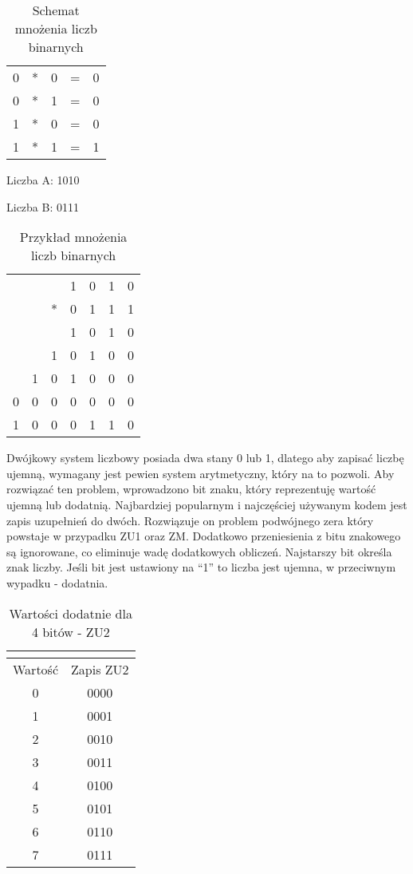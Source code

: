 \documentclass[12pt, a4paper, onside, polish]{article}				%
\begin{document}
\begin{table}[htb]
\caption{Schemat mnożenia liczb binarnych}
\centering
\begin{tabular}{lllll}
0 & * & 0 & = & 0 \\
0 & * & 1 & = & 0 \\
1 & * & 0 & = & 0 \\
1 & * & 1 & = & 1
\end{tabular}
\end{table}

Liczba A: 1010

Liczba B: 0111
\begin{table}[htb]
\caption{Przykład mnożenia liczb binarnych}
\centering
\begin{tabular}{lllllll}
 &  &  & 1 & 0 & 1 & 0 \\
 &  & * & 0 & 1 & 1 & 1 \\ \cline{3-7} 
 &  &  & 1 & 0 & 1 & 0 \\
 &  & 1 & 0 & 1 & 0 & 0 \\
 & 1 & 0 & 1 & 0 & 0 & 0 \\
0 & 0 & 0 & 0 & 0 & 0 & 0 \\ \hline
1 & 0 & 0 & 0 & 1 & 1 & 0 
\end{tabular}
\end{table}
\fi
Dwójkowy system liczbowy posiada dwa stany 0 lub 1, dlatego aby zapisać liczbę ujemną, wymagany jest pewien system arytmetyczny, który na to pozwoli. Aby rozwiązać ten problem, wprowadzono bit znaku, który reprezentuję wartość ujemną lub dodatnią. Najbardziej popularnym i najczęściej używanym kodem jest zapis uzupełnień do dwóch. Rozwiązuje on problem podwójnego zera który powstaje w przypadku ZU1 oraz ZM. Dodatkowo przeniesienia z bitu znakowego są ignorowane, co eliminuje wadę dodatkowych obliczeń. Najstarszy bit określa znak liczby. Jeśli bit jest ustawiony na “1” to liczba jest ujemna, w przeciwnym wypadku - dodatnia.  

\begin{table}[htb]
\caption{Wartości dodatnie dla 4 bitów - ZU2}
\centering
\begin{tabular}{cc}
\multicolumn{1}{l}{} & \multicolumn{1}{l}{} \\ \hline
\multicolumn{1}{|c|}{Wartość} & \multicolumn{1}{c|}{Zapis ZU2} \\ \hline
\multicolumn{1}{|c|}{0} & \multicolumn{1}{c|}{0000} \\ \hline
\multicolumn{1}{|c|}{1} & \multicolumn{1}{c|}{0001} \\ \hline
\multicolumn{1}{|c|}{2} & \multicolumn{1}{c|}{0010} \\ \hline
\multicolumn{1}{|c|}{3} & \multicolumn{1}{c|}{0011} \\ \hline
\multicolumn{1}{|c|}{4} & \multicolumn{1}{c|}{0100} \\ \hline
\multicolumn{1}{|c|}{5} & \multicolumn{1}{c|}{0101} \\ \hline
\multicolumn{1}{|c|}{6} & \multicolumn{1}{c|}{0110} \\ \hline
\multicolumn{1}{|c|}{7} & \multicolumn{1}{c|}{0111} \\ \hline
\end{tabular}
\end{table}
\end{document}

